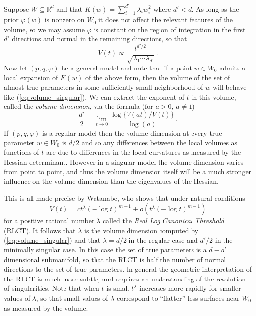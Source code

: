 \documentclass{article} %
\def\be{\begin{equation}}
\def\ee{\end{equation}}
\begin{document}
Suppose $W \subseteq \mathbb{R}^d$ and that $K(w) = \sum_{i=1}^{d'} \lambda_i w_i^2$ where $d' < d$. As long as the prior $\varphi(w)$ is nonzero on $W_0$ it does not affect the relevant features of the volume, so we may assume $\varphi$ is constant on the region of integration in the first $d'$ directions and normal in the remaining directions, so that
\begin{equation}\label{eq:volume_singular}
V(t) \propto \frac{t^{d'/2}}{\sqrt{\lambda_1 \cdots \lambda_{d'}}}\,.
\end{equation}
Now let $(p,q,\varphi)$ be a general model and note that if a point $w \in W_0$ admits a local expansion of $K(w)$ of the above form, then the volume of the set of almost true parameters in some sufficiently small neighborhood of $w$ will behave like (\ref{eq:volume_singular}). We can extract the exponent of $t$ in this volume, called the \emph{volume dimension}, via the formula (for $a > 0$, $a \neq 1$)
\be\label{eq:limit_volumedim}
\frac{d'}{2} = \lim_{t \to 0} \frac{\log\big\{V(at)/V(t)\big\}}{\log(a)}\,.
\ee
If $(p, q, \varphi)$ is a regular model then the volume dimension at every true parameter $w \in W_0$ is $d/2$ and so any differences between the local volumes as functions of $t$ are due to differences in the local curvatures as measured by the Hessian determinant. However in a singular model the volume dimension varies from point to point, and thus the volume dimension itself will be a much stronger influence on the volume dimension than the eigenvalues of the Hessian. 

This is all made precise by Watanabe, who shows that under natural conditions \citep[Theorem 7.1]{watanabe_algebraic_2009} 
\[
V(t) = c t^\lambda (- \log t)^{m-1} + o( t^\lambda ( - \log t)^{m-1})
\]
for a positive rational number $\lambda$ called the \emph{Real Log Canonical Threshold} (RLCT). It follows that $\lambda$ is the volume dimension computed by (\ref{eq:volume_singular}) and that $\lambda = d/2$ in the regular case and $d'/2$ in the minimally singular case. In this case the set of true parameters is a $d - d'$ dimensional submanifold, so that the RLCT is half the number of normal directions to the set of true parameters. In general the geometric interpretation of the RLCT is much more subtle, and requires an understanding of the resolution of singularities. Note that when $t$ is small $t^\lambda$ increases more rapidly for smaller values of $\lambda$, so that small values of $\lambda$ correspond to ``flatter'' loss surfaces near $W_0$ as measured by the volume.
\end{document}
